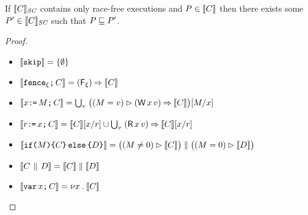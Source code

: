 \begin{theorem}
  If $\llbracket C\rrbracket_{\textit{SC}}$ contains only race-free executions and
  $P\in\llbracket C\rrbracket$ then there exists some $P'\in\llbracket C\rrbracket_{\textit{SC}}$ such
  that $P\sqsubseteq P'$.
\begin{proof}
  \begin{itemize}
  \item
    \begin{math}
      \llbracket\texttt{skip}\rrbracket
      =
      \{ \emptyset \} 
    \end{math}
  \item
    \begin{math}
      \llbracket\texttt{fence}_{\xi}\texttt{;}\, C\rrbracket
      =
      (\mathsf{F}_{\xi}) \mathbin\Rightarrow \llbracket C\rrbracket
    \end{math}
  \item
    \begin{math}
      \sem{\aLoc\GETS\aExp\SEMI \aCmd}
      =
      \textstyle\bigcup_\aVal\; \bigl((\aExp=\aVal) \guard (\DW\aLoc\aVal) \prefix \sem{\aCmd}\bigr)[\aExp/\aLoc]
    \end{math}
  \item
    \begin{math}
      \sem{\aReg\GETS\aLoc\SEMI \aCmd}
      =
      \sem{\aCmd}[\aLoc/\aReg] \cup \textstyle\bigcup_\aVal\; (\DR\aLoc\aVal) \prefix \sem{\aCmd}[\aLoc/\aReg]
    \end{math}
  \item
    \begin{math}
      \llbracket\texttt{if}\allowbreak\texttt{(}M\texttt{)} \allowbreak\texttt{\{} C \texttt{\}}\,\allowbreak\texttt{else}\allowbreak\,\texttt{\{} D \texttt{\}}\rrbracket
      =
      \bigl((M \neq 0) \mathbin\rhd \llbracket C\rrbracket\bigr) \parallel \bigl((M=0) \mathbin\rhd \llbracket D\rrbracket\bigr)
    \end{math}
  \item
    \begin{math}
      \llbracket C \,\mathbin{\|}\, D\rrbracket
      =
      \llbracket C\rrbracket \parallel \llbracket D\rrbracket
    \end{math}
  \item
    \begin{math}
      \llbracket\texttt{var}\,x\texttt{;}\, C\rrbracket
      =
      \nu x \mathbin. \llbracket C\rrbracket
    \end{math}
\end{itemize}
  
\end{proof}
\end{theorem}


